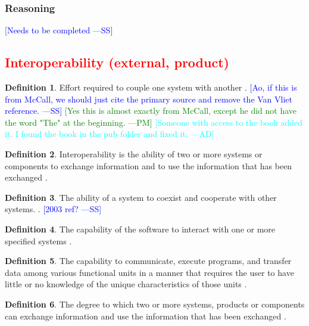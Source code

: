 \documentclass[letterpaper, cleveref]{lipics-v2019}
\newcommand{\authornote}[3]{\textcolor{#1}{[#3 ---#2]}}
\newcommand{\authornote}[3]{}
\newcommand{\wss}[1]{\authornote{blue}{SS}{#1}} %
\newcommand{\pmi}[1]{\authornote{green}{PM}{#1}} %
\newcommand{\ad}[1]{\authornote{cyan}{AD}{#1}} %
\newcommand{\notdone}[1]{\textcolor{red}{#1}}
\theoremstyle{definition}
\newtheorem{defn}{Definition}
\begin{document}
\subsubsection*{Reasoning}

\wss{Needs to be completed}


\subsection{\notdone{Interoperability (external, product)}} %

\begin{defn}
  Effort required to couple one system with another \citep{McCallEtAl1977}.
  \wss{Ao, if this is from McCall, we should just cite the primary source
  and remove the Van Vliet reference.} \pmi{Yes this is almost exactly from
  McCall, except he did not have the word "The" at the beginning.}
  \ad{Someone with access to the book added it. I found the book in the pub
  folder and fixed it.}
\end{defn}

\begin{defn}
  Interoperability is the ability of two or more systems or components to
  exchange information and to use the information that has been exchanged
  \citep{IEEEComputerDictionary1991}.
\end{defn}

\begin{defn}
  The ability of a system to coexist and cooperate with other systems.
  \citep{ghezzi1991fundamentals}.  \wss{2003 ref?}
\end{defn}

\begin{defn}
  The capability of the software to interact with one or more specified
  systems \cite{ISO9126}. %
\end{defn}

\begin{defn}
  The capability to communicate, execute programs, and transfer data among
  various functional units in a manner that requires the user to have little
  or no knowledge of the unique characteristics of those units
  \citep{ISO/IEC/IEEE24765}. %
\end{defn}

\begin{defn}
  \label{InteroperabilitySelected} The degree to which two or more systems,
  products or components can exchange information and use the information
  that has been exchanged \citep{ISO/IEC25010}. %
\end{defn}
\end{document}
